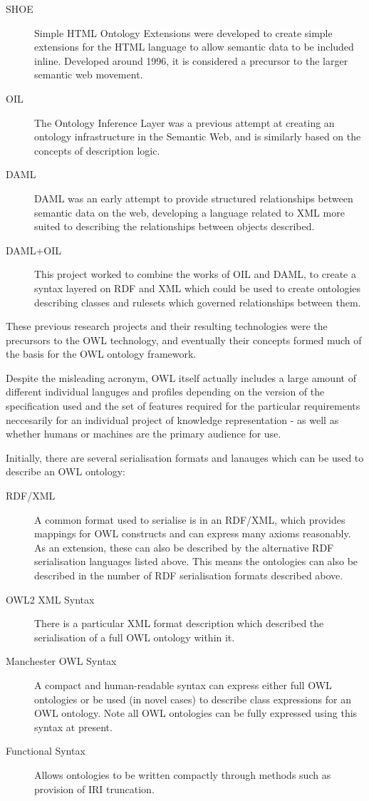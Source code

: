 \documentclass{article}
\begin{document}
\begin{description}
    \item[SHOE] Simple HTML Ontology Extensions were developed to create simple
    extensions for the HTML language to allow semantic data to be included
    inline. Developed around 1996, it is considered a precursor to the larger
    semantic web movement.\cite{shoe}
    \item[OIL] The Ontology Inference Layer was a previous attempt at creating
    an ontology infrastructure in the Semantic Web, and is similarly based on
    the concepts of description logic.
    \item[DAML] DAML was an early attempt to provide structured relationships
    between semantic data on the web, developing a language related to XML more
    suited to describing the relationships between objects described.
    \item[DAML+OIL] This project worked to combine the works of OIL and DAML, to
    create a syntax layered on RDF and XML which could be used to create
    ontologies describing classes and rulesets which governed relationships
    between them.
\end{description}

These previous research projects and their resulting technologies were the
precursors to the OWL technology, and eventually their concepts formed much of
the basis for the OWL ontology framework.

Despite the misleading acronym, OWL itself actually includes a large amount of
different individual languges and profiles depending on the version of the 
specification used and the set of features required for the particular
requirements neccesarily for an individual project of knowledge
representation - as well as whether humans or machines are the primary audience 
for use. 

Initially, there are several serialisation formats and lanauges which can be
used to describe an OWL ontology:

\begin{description}
    \item[RDF/XML] A common format used to serialise is in an RDF/XML, which
    provides mappings for OWL constructs and can express many axioms
    reasonably. As an extension, these can also be described by the alternative
    RDF serialisation languages listed above. This means the ontologies can also
    be described in the number of RDF serialisation formats described above.
    \item[OWL2 XML Syntax] There is a particular XML format description which
    described the serialisation of a full OWL ontology within it.
    \item[Manchester OWL Syntax] A compact and human-readable syntax can express
    either full OWL ontologies or be used (in novel cases) to describe class
    expressions for an OWL ontology. Note all OWL ontologies can be fully
    expressed using this syntax at present.
    \item[Functional Syntax] Allows ontologies to be written compactly through
    methods such as provision of IRI truncation.
\end{description}
\end{document}
